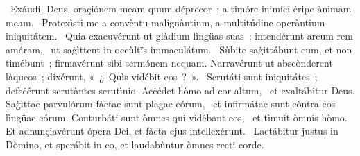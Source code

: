 \psalmChapterWithInscription{}
{ }
{%
~Exáudi, Deus, oraçiónem meam quum déprecor~; a timóre inimíci éripe ànimam meam. 
~Protexìsti me a convèntu malignàntium, a multitúdine operàntium iniquitátem. 
~Quia exacuvérunt ut glàdium lìngüas suas~; intendérunt arcum rem amáram, 
~ut saġìttent in occùltïs immaculátum. 
~Sùbite saġittábunt eum, et non timébunt~; firmavérunt sìbi sermónem nequam. Narravérunt ut abscònderent làqueos~; dixérunt, «~¿~Quìs vidébit eos~?~». 
~Scrutáti sunt iniquitátes~; defeċérunt scrutàntes scrutìnio. Acċédet hòmo ad cor altum, 
~et exaltábitur Deus. Saġìttae parvulórum fàctae sunt plagae eórum, 
~et infirmátae sunt còntra eos lìngüae eórum. Conturbáti sunt òmnes qui vidébant eos, 
~et tìmuit òmnis hòmo. Et adnunçiavérunt ópera Dei, et fàcta ejus intellexérunt. 
~Laetábitur justus in Dòmino, et sperábit in eo, et laudabùntur òmnes recti corde. 
}
